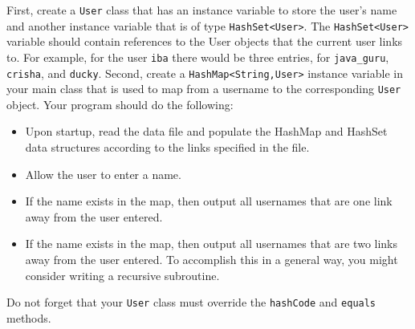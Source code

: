 \begin{questions}
First, create a \texttt{User} class that has an instance variable to store the user’s name
and another instance variable that is of type \texttt{HashSet<User>}. The \texttt{HashSet<User>}
variable should contain references to the User objects that the current user links
to. For example, for the user \texttt{iba} there would be three entries, for \texttt{java\_guru},
\texttt{crisha}, and \texttt{ducky}. Second, create a
\texttt{HashMap<String,User>} instance variable in your main class that is used to map from a username to the corresponding \texttt{User}
object. Your program should do the following:
\begin{itemize}
  \item Upon startup, read the data file and populate the HashMap and HashSet data
structures according to the links specified in the file.
  \item Allow the user to enter a name.
  \item If the name exists in the map, then output all usernames that are one link away
from the user entered.
\item If the name exists in the map, then output all usernames that are two links away
from the user entered. To accomplish this in a general way, you might consider
writing a recursive subroutine.
\end{itemize}
Do not forget that your \texttt{User} class must override the \texttt{hashCode} and \texttt{equals} methods.



\end{questions}


